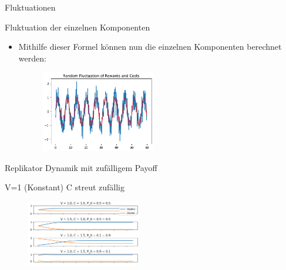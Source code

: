 \documentclass{beamer}
\begin{document}

\begin{frame}{Fluktuationen}
    \begin{block}{Fluktuation der einzelnen Komponenten}
    \begin{itemize}
    \item Mithilfe dieser Formel können nun die einzelnen Komponenten berechnet werden: \pause
    \begin{figure}[htp]
            \centering
            \includegraphics[width=5cm]{RFluc.png}
            \label{fig:randomfluctuation}
        \end{figure}
    \end{itemize}
    \end{block} 
    
\end{frame}


\begin{frame}{Replikator Dynamik mit zufälligem Payoff}
    \begin{block}{V=1 (Konstant) C streut zufällig}
    \begin{itemize}
        \begin{figure}[htp]
            \centering
            \includegraphics[width=5cm]{Konstant.png}
            \label{fig:finalpot}
        \end{figure}
    \end{itemize}
    \end{block} 
    
\end{frame}

\end{document}
